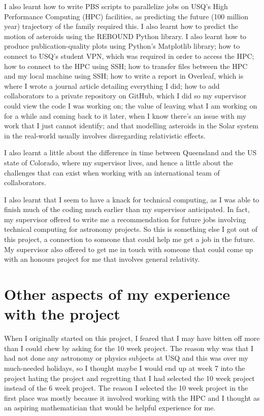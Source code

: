 \documentclass[12pt,a4paper,openright]{article}
\begin{document}
I also learnt how to write PBS scripts to parallelize jobs on USQ's High Performance Computing (HPC) facilities, as predicting the future (100 million year) trajectory of the family required this. I also learnt how to predict the motion of asteroids using the REBOUND Python library. I also learnt how to produce publication-quality plots using Python's Matplotlib library; how to connect to USQ's student VPN, which was required in order to access the HPC; how to connect to the HPC using SSH; how to transfer files between the HPC and my local machine using SSH; how to write a report in Overleaf, which is where I wrote a journal article detailing everything I did; how to add collaborators to a private repository on GitHub, which I did so my supervisor could view the code I was working on; the value of leaving what I am working on for a while and coming back to it later, when I know there's an issue with my work that I just cannot identify; and that modelling asteroids in the Solar system in the real-world usually involves disregarding relativistic effects.

I also learnt a little about the difference in time between Queensland and the US state of Colorado, where my supervisor lives, and hence a little about the challenges that can exist when working with an international team of collaborators.

I also learnt that I seem to have a knack for technical computing, as I was able to finish much of the coding much earlier than my supervisor anticipated. In fact, my supervisor offered to write me a recommendation for future jobs involving technical computing for astronomy projects. So this is something else I got out of this project, a connection to someone that could help me get a job in the future. My supervisor also offered to get me in touch with someone that could come up with an honours project for me that involves general relativity. 

\section{Other aspects of my experience with the project}
When I originally started on this project, I feared that I may have bitten off more than I could chew by asking for the 10 week project. The reason why was that I had not done any astronomy or physics subjects at USQ and this was over my much-needed holidays, so I thought maybe I would end up at week 7 into the project hating the project and regretting that I had selected the 10 week project instead of the 6 week project. The reason I selected the 10 week project in the first place was mostly because it involved working with the HPC and I thought as an aspiring mathematician that would be helpful experience for me. 
\end{document}
